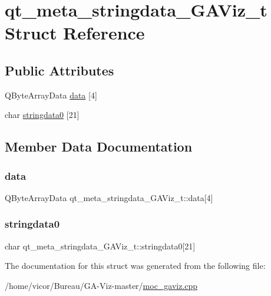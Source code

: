 \hypertarget{structqt__meta__stringdata___g_a_viz__t}{}\section{qt\+\_\+meta\+\_\+stringdata\+\_\+\+G\+A\+Viz\+\_\+t Struct Reference}
\label{structqt__meta__stringdata___g_a_viz__t}
\subsection*{Public Attributes}
\begin{DoxyCompactItemize}
\item 
Q\+Byte\+Array\+Data \hyperlink{structqt__meta__stringdata___g_a_viz__t_a0e3f8170f5c1dc9372bf369ac979f0b8}{data} \mbox{[}4\mbox{]}
\item 
char \hyperlink{structqt__meta__stringdata___g_a_viz__t_a5dc612801d50c66d8c631d8fade55923}{stringdata0} \mbox{[}21\mbox{]}
\end{DoxyCompactItemize}


\subsection{Member Data Documentation}
\mbox{\label{structqt__meta__stringdata___g_a_viz__t_a0e3f8170f5c1dc9372bf369ac979f0b8}} 
\subsubsection{\texorpdfstring{data}{data}}
{\footnotesize\ttfamily Q\+Byte\+Array\+Data qt\+\_\+meta\+\_\+stringdata\+\_\+\+G\+A\+Viz\+\_\+t\+::data\mbox{[}4\mbox{]}}

\mbox{\label{structqt__meta__stringdata___g_a_viz__t_a5dc612801d50c66d8c631d8fade55923}} 
\subsubsection{\texorpdfstring{stringdata0}{stringdata0}}
{\footnotesize\ttfamily char qt\+\_\+meta\+\_\+stringdata\+\_\+\+G\+A\+Viz\+\_\+t\+::stringdata0\mbox{[}21\mbox{]}}



The documentation for this struct was generated from the following file\+:\begin{DoxyCompactItemize}
\item 
/home/vicor/\+Bureau/\+G\+A-\/\+Viz-\/master/\hyperlink{moc__gaviz_8cpp}{moc\+\_\+gaviz.\+cpp}\end{DoxyCompactItemize}
